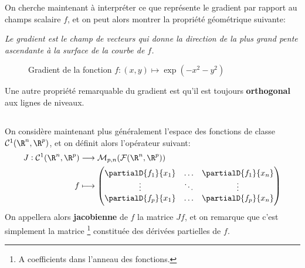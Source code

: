 On cherche maintenant à interpréter ce que représente le gradient par rapport au champs scalaire \(f\), et on peut alors montrer la propriété géométrique suivante:
\begin{center}
   \textit{Le gradient est le champ de vecteurs qui donne la direction de la plus grand pente ascendante à la surface de la courbe de \(f\).}
\end{center}
\begin{figure}[h]
   \centering
   \vspace*{-0.5mm}
   \captionsetup{labelformat=empty}
   \caption{Gradient de la fonction \(f : (x, y) \mapsto \exp(-x^2 - y^2)\)}
\end{figure}
Une autre propriété remarquable du gradient est qu'il est toujours \textbf{orthogonal} aux lignes de niveaux.

\subsection*{}
On considère maintenant plus généralement l'espace des fonctions de classe \(\mathcal{C}^1(\R^n, \R^p)\), et on définit alors l'opérateur suivant:
\[
   \begin{aligned}
      J : \mathcal{C}^1(\R^n, \R^p) &\longrightarrow \mathcal{M}_{p, n}(\mathcal{F}(\R^n, \R^p))\\
      f &\longmapsto \begin{pmatrix}
         \partialD{f_1}{x_1} &\ldots &\partialD{f_1}{x_n}\\
         \vdots &\ddots &\vdots \\ 
         \partialD{f_p}{x_1} &\ldots &\partialD{f_p}{x_n}
      \end{pmatrix}
   \end{aligned}
\]
On appellera alors \textbf{jacobienne} de \(f\) la matrice \(Jf\), et on remarque que c'est simplement la matrice \footnote[1]{A coefficients dans l'anneau des fonctions.} constituée des dérivées partielles de \(f\).
\pagebreak


